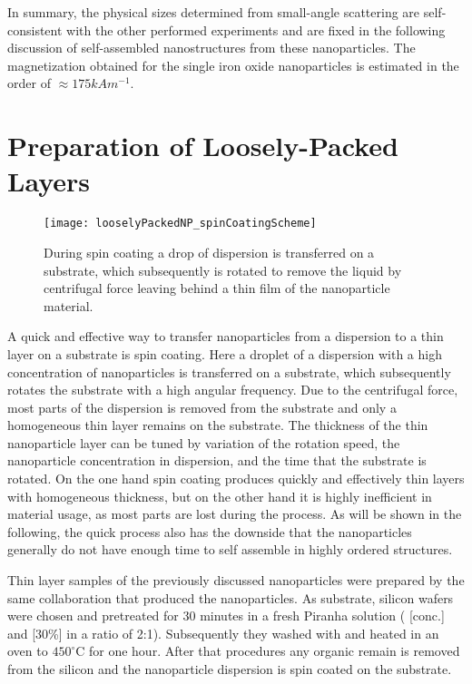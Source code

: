 \documentclass[\main/dresen_thesis.tex]{subfiles}
\begin{document}
In summary, the physical sizes determined from small-angle scattering are self-consistent with the other performed experiments and are fixed in the following discussion of self-assembled nanostructures from these nanoparticles.
The magnetization obtained for the single iron oxide nanoparticles is estimated in the order of $\approx 175 \unit{kAm^{-1}}$.

\section{Preparation of Loosely-Packed Layers}
\begin{figure}[tb]
  \centering
  \texttt{[image: looselyPackedNP\_spinCoatingScheme]}
  \caption{\label{fig:looselyPackedNP:preparation:spinCoatingScheme}During spin coating a drop of dispersion is transferred on a substrate, which subsequently is rotated to remove the liquid by centrifugal force leaving behind a thin film of the nanoparticle material.}
\end{figure}

A quick and effective way to transfer nanoparticles from a dispersion to a thin layer on a substrate is spin coating.
Here a droplet of a dispersion with a high concentration of nanoparticles is transferred on a substrate, which subsequently rotates the substrate with a high angular frequency.
Due to the centrifugal force, most parts of the dispersion is removed from the substrate and only a homogeneous thin layer remains on the substrate.
The thickness of the thin nanoparticle layer can be tuned by variation of the rotation speed, the nanoparticle concentration in dispersion, and the time that the substrate is rotated.
On the one hand spin coating produces quickly and effectively thin layers with homogeneous thickness, but on the other hand it is highly inefficient in material usage, as most parts are lost during the process.
As will be shown in the following, the quick process also has the downside that the nanoparticles generally do not have enough time to self assemble in highly ordered structures.

Thin layer samples of the previously discussed nanoparticles were prepared by the same collaboration that produced the nanoparticles.
As substrate, silicon wafers were chosen and pretreated for 30 minutes in a fresh Piranha solution ( [conc.] and  [30\%] in a ratio of 2:1). Subsequently they washed with  and heated in an oven to $450 ^\circ \mathrm{C}$ for one hour.
After that procedures any organic remain is removed from the silicon and the nanoparticle dispersion is spin coated on the substrate.
\end{document}
